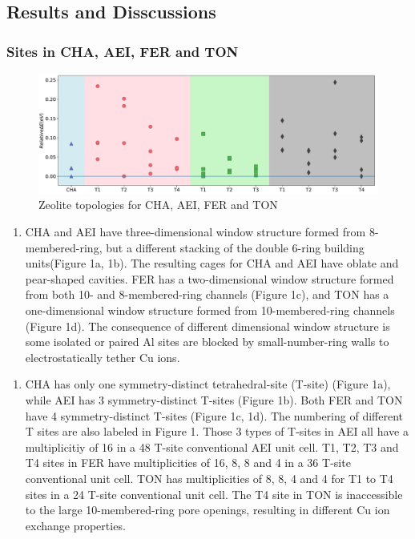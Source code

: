 \documentclass[12pt]{article}
\begin{document}
\subsection*{Results and Disscussions}
\subsubsection*{Sites in CHA, AEI, FER and TON}
\begin{figure}[H]
\centering
 \includegraphics[width=5.2in]{./Figures/Figure-1}
 \caption{Zeolite topologies for CHA, AEI, FER and TON}
 \label{Topologies}
\end{figure}

\begin{enumerate}
\item CHA and AEI have three-dimensional window structure formed from 8-membered-ring, but a different stacking of the double 6-ring building units(Figure 1a, 1b). The resulting cages for CHA and AEI have oblate and pear-shaped cavities. FER has a two-dimensional window structure formed from both 10- and 8-membered-ring channels (Figure 1c), and TON has a one-dimensional window structure formed from 10-membered-ring channels (Figure 1d).  The consequence of different dimensional window structure is some isolated or paired Al sites are blocked by small-number-ring walls to electrostatically tether Cu ions.
\end{enumerate}

\begin{enumerate}[resume]
\item CHA has only one symmetry-distinct tetrahedral-site (T-site) (Figure 1a), while AEI has 3 symmetry-distinct T-sites (Figure 1b). Both FER and TON have 4 symmetry-distinct T-sites (Figure 1c, 1d). The numbering of different T sites are also labeled in Figure 1. Those 3 types of T-sites in AEI all have a multiplicitiy of 16 in a 48 T-site conventional AEI unit cell. T1, T2, T3 and T4 sites in FER have multiplicities of 16, 8, 8 and 4 in a 36 T-site conventional unit cell. TON has multiplicities of 8, 8, 4 and 4 for T1 to T4 sites in a 24 T-site conventional unit cell. The T4 site in TON is inaccessible to the large 10-membered-ring pore openings, resulting in different Cu ion exchange properties.
\end{enumerate}
\end{document}
